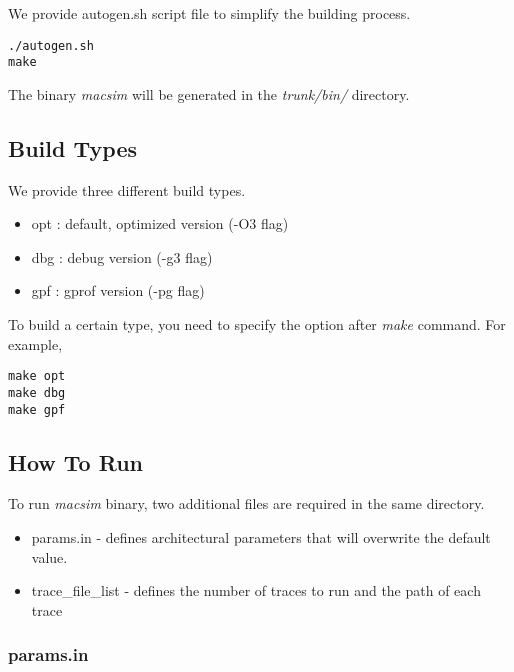 We provide autogen.sh script file to simplify the building process.

\smallskip
\begin{lstlisting}
./autogen.sh
make
\end{lstlisting}
\smallskip

The binary \textit{macsim} will be generated in the
\textit{trunk/bin/} directory.





\subsection{Build Types}

We provide three different build types.

\begin{itemize}
  \item opt : default, optimized version (-O3 flag)
  \item dbg : debug version (-g3 flag)
  \item gpf : gprof version (-pg flag)
\end{itemize}

To build a certain type, you need to specify the option
after \textit{make} command. For example,

\smallskip
\begin{lstlisting}
make opt
make dbg
make gpf
\end{lstlisting}
\smallskip





\subsection{How To Run \SIM}

To run \textit{macsim} binary, two additional files are required in
the same directory.

\begin{itemize}
  \item params.in - defines architectural parameters that will
  overwrite the default value.

  \item trace\_file\_list - defines the number of traces to run and
  the path of each trace
\end{itemize}

\subsubsection{params.in}

